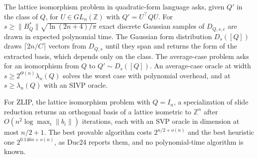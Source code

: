 \begin{borrowed}
The lattice isomorphism problem in quadratic-form language asks, given $Q'$ in the
class of $Q$, for $U\in GL_n(\mathbb Z)$ with $Q'=U^\top QU$. For
$s\ge\lVert B_Q^*\rVert\sqrt{\ln(2n+4)/\pi}$ exact discrete Gaussian samples of
$D_{Q,s,c}$ are drawn in expected polynomial time. The Gaussian form distribution
$D_s([Q])$ draws $\lceil2n/C\rceil$ vectors from $D_{Q,s}$ until they span and returns
the form of the extracted basis, which depends only on the class. The average-case
problem asks for an isomorphism from $Q$ to $Q'\sim D_s([Q])$. An average-case oracle at
width $s\ge2^{\Theta(n)}\lambda_n(Q)$ solves the worst case with polynomial overhead, and
at $s\ge\lambda_n(Q)$ with an SIVP oracle.
\end{borrowed}

\begin{borrowed}
For ZLIP, the lattice isomorphism problem with $Q=I_n$, a specialization of slide
reduction returns an orthogonal basis of a lattice isometric to $\mathbb Z^n$ after
$O(n^2\log\max_i\lVert b_i\rVert)$ iterations, each with an SVP oracle in dimension at
most $n/2+1$. The best provable algorithm costs $2^{n/2+o(n)}$ and the best heuristic
one $2^{0.146n+o(n)}$, as Duc24 reports them, and no polynomial-time algorithm is known.
\end{borrowed}

